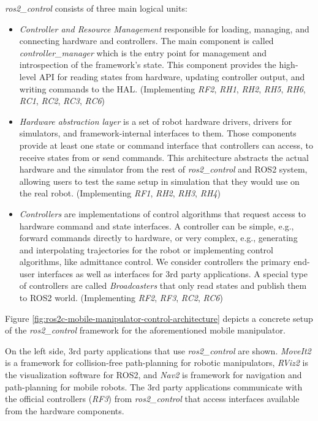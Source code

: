 \documentclass[journal]{IEEEtran}
\newcommand{\comment}[1]{}
\begin{document}
\emph{ros2\_control} consists of three main logical units:
\begin{itemize}
    \item \emph{Controller and Resource Management} responsible for loading, managing, and connecting hardware and controllers. The main component is called \emph{controller\_manager} which is the entry point for management and introspection of the framework's state. This component provides the high-level API for reading states from hardware, updating controller output, and writing commands to the HAL. (Implementing \emph{RF2}, \emph{RH1}, \emph{RH2}, \emph{RH5}, \emph{RH6},  \emph{RC1}, \emph{RC2}, \emph{RC3}, \emph{RC6})
    \item \emph{Hardware abstraction layer} is a set of robot hardware drivers, drivers for simulators, and framework-internal interfaces to them. Those components provide at least one state or command interface that controllers can access, to receive states from or send commands. This architecture abstracts the actual hardware and the simulator from the rest of \emph{ros2\_control} and ROS2 system, allowing users to test the same setup in simulation that they would use on the real robot. (Implementing \emph{RF1}, \emph{RH2}, \emph{RH3}, \emph{RH4})
    \item \emph{Controllers} are implementations of control algorithms that request access to hardware command and state interfaces. A controller can be simple, e.g., forward commands directly to hardware, or very complex, e.g., generating and interpolating trajectories for the robot or implementing control algorithms, like admittance control. We consider controllers the primary end-user interfaces as well as interfaces for 3rd party applications. A special type of controllers are called \emph{Broadcasters} that only read states and publish them to ROS2 world. (Implementing \emph{RF2}, \emph{RF3}, \emph{RC2}, \emph{RC6})
\end{itemize}



Figure \ref{fig:ros2c-mobile-manipulator-control-architecture} depicts a concrete setup of the \emph{ros2\_control} framework for the aforementioned mobile manipulator.
\comment{The different symbols in the legend show different hardware interface types, which can be claimed by any controller with a compatible connecting interface type.}
On the left side, 3rd party applications that use \emph{ros2\_control} are shown. \emph{MoveIt2} is a framework for collision-free path-planning for robotic manipulators, \emph{RViz2} is the visualization software for ROS2, and \emph{Nav2} is framework for navigation and path-planning for mobile robots.
The 3rd party applications communicate with the official controllers (\emph{RF3}) from \emph{ros2\_control} that access interfaces available from the hardware components.
\end{document}
